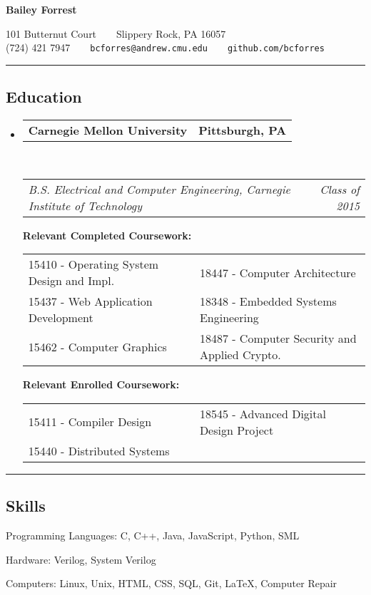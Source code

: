 \documentclass[10pt, letterpaper]{article}
\makeatletter
\newcommand{\titleTopOffset}{-1.0em} %
\newcommand{\titleBotOffset}{-0.4em} %
\newenvironment{indentsection}[1]%
{\begin{list}{}
    {\setlength{\leftmargin}{#1}}
    \item[]
}
{\end{list}}
\newcommand{\headerrow}[2]
{\begin{tabular*}{\linewidth}{l@{\extracolsep{\fill}}r}
    #1 & #2 \\
\end{tabular*}}
\newcommand{\sectionheader}[1]
{\hrule
\vspace{\titleTopOffset}
\subsection*{#1}
\vspace{\titleBotOffset}}
\makeatother
\begin{document}
\begin{center}
{\LARGE \textbf{Bailey Forrest}}

101 Butternut Court\ \ \textbullet \ \ Slippery Rock, PA 16057 \\
(724) 421 7947\ \ \textbullet \ \ \texttt{bcforres@andrew.cmu.edu}\ \ \textbullet \ \ \texttt{github.com/bcforres}
\end{center}

\sectionheader{Education}
\begin{itemize}
    \item
        \headerrow
            {\textbf{Carnegie Mellon University}}
            {\textbf{Pittsburgh, PA}}
        \\
        \headerrow
            {\emph{B.S. Electrical and Computer Engineering, Carnegie Institute of Technology}}
            {\emph{Class of 2015}}


        \smallskip
        \textbf{Relevant Completed Coursework:}

        \begin{tabular*}{\linewidth}{p{0.5\linewidth}  p{0.5\linewidth}}
            15410 - Operating System Design and Impl. & 18447 - Computer Architecture \\
            15437 - Web Application Development & 18348 - Embedded Systems Engineering \\
            15462 - Computer Graphics & 18487 - Computer Security and Applied Crypto. \\
        \end{tabular*}


        \smallskip
        \textbf{Relevant Enrolled Coursework:}

        \begin{tabular*}{\linewidth}{p{0.5\linewidth}  p{0.5\linewidth}}
            15411 - Compiler Design & 18545 - Advanced Digital Design Project \\
            15440 - Distributed Systems & \\
        \end{tabular*}

\end{itemize}


\sectionheader{Skills}
\begin{indentsection}{\parindent}
    \begin{description*}
        \item[Programming Languages:]
            C, C++, Java, JavaScript, Python, SML

        \item[Hardware:]
            Verilog, System Verilog

        \item[Computers:]
            Linux, Unix, HTML, CSS, SQL, Git, \LaTeX, Computer Repair

    \end{description*}
\end{indentsection}
\end{document}
